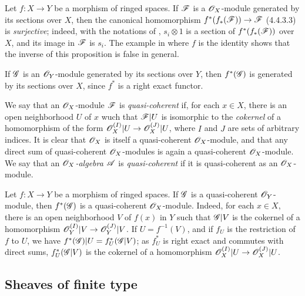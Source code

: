 \begin{env}[5.1.2]
\label{0.5.1.2}
Let $f:X\to Y$ be a morphism of ringed spaces. If $\mathscr{F}$ is a $\mathscr{O}_X$-module generated by
its sections over $X$, then the canonical homomorphism $f^*(f_*(\mathscr{F}))\to\mathscr{F}$ (4.4.3.3)
is {\em surjective}; indeed, with the notations of , $s_i\otimes 1$ is a
section of $f^*(f_*(\mathscr{F}))$ over $X$, and its image in $\mathscr{F}$ is $s_i$. The example in
 where $f$ is the identity shows that the inverse of this proposition is
false in general.

If $\mathscr{G}$ is an $\mathscr{O}_Y$-module generated by its sections over $Y$, then $f^*(\mathscr{G})$ is
generated by its sections over $X$, since $f^*$ is a right exact functor.
\end{env}

\begin{env}[5.1.3]
\label{0.5.1.3}
We say that an $\mathscr{O}_X$-module $\mathscr{F}$ is {\em quasi-coherent} if, for each $x\in X$, there
is an open neighborhood $U$ of $x$ wuch that $\mathscr{F}|U$ is isomorphic to the {\em cokernel}
of a homomorphism of the form $\mathscr{O}_X^{(I)}|U\to\mathscr{O}_X^{(J)}|U$, where $I$ and $J$ are sets of
arbitrary indices. It is clear that $\mathscr{O}_X$ is itself a quasi-coherent $\mathscr{O}_X$-module, and
that any direct sum of quasi-coherent $\mathscr{O}_X$-modules is again a quasi-coherent
$\mathscr{O}_X$-module. We say that an {\em $\mathscr{O}_X$-algebra $\mathscr{A}$} is {\em quasi-coherent} if
it is quasi-coherent as an $\mathscr{O}_X$-module.
\end{env}

\begin{env}[5.1.4]
\label{0.5.1.4}
Let $f:X\to Y$ be a morphism of ringed spaces. If $\mathscr{G}$ is a quasi-coherent
$\mathscr{O}_Y$-module, then $f^*(\mathscr{G})$ is a quasi-coherent $\mathscr{O}_X$-module. Indeed, for each
$x\in X$, there is an open neighborhood $V$ of $f(x)$ in $Y$ such that $\mathscr{G}|V$ is the
cokernel of a homomorphism $\mathscr{O}_Y^{(I)}|V\to\mathscr{O}_Y^{(J)}|V$. If $U=f^{-1}(V)$, and if $f_U$ is
the restriction of $f$ to $U$, we have $f^*(\mathscr{G})|U=f_U^*(\mathscr{G}|V)$; as $f_U^*$ is right
exact and commutes with direct sums, $f_U^*(\mathscr{G}|V)$ is the cokernel of a homomorphism
$\mathscr{O}_X^{(I)}|U\to\mathscr{O}_X^{(J)}|U$.
\end{env}

\subsection{Sheaves of finite type}
\label{subsection-sheaves-of-finite-type}

